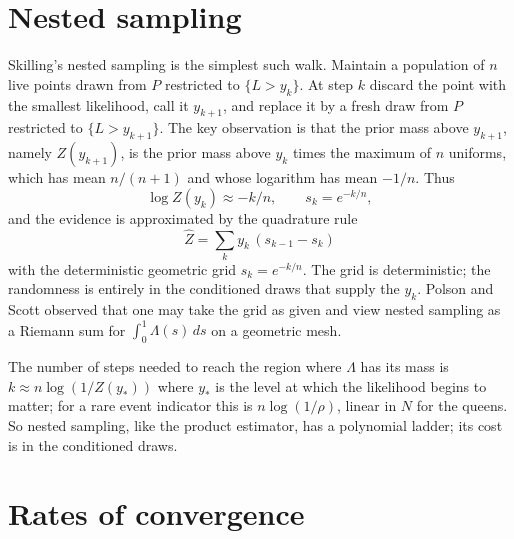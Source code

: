 \documentclass[11pt,twoside,openany]{book}
\theoremstyle{plain}
\theoremstyle{definition}
\theoremstyle{remark}
\begin{document}
\section{Nested sampling}

Skilling's nested sampling is the simplest such walk. Maintain a population of $n$ live points drawn from $P$ restricted to $\{L > y_k\}$. At step $k$ discard the point with the smallest likelihood, call it $y_{k+1}$, and replace it by a fresh draw from $P$ restricted to $\{L > y_{k+1}\}$. The key observation is that the prior mass above $y_{k+1}$, namely $Z(y_{k+1})$, is the prior mass above $y_k$ times the maximum of $n$ uniforms, which has mean $n / (n+1)$ and whose logarithm has mean $-1/n$. Thus
\[
\log Z(y_k) \approx -k / n , \qquad s_k = e^{-k/n} ,
\]
and the evidence is approximated by the quadrature rule
\[
\hat Z = \sum_k y_k \, ( s_{k-1} - s_k )
\]
with the deterministic geometric grid $s_k = e^{-k/n}$. The grid is deterministic; the randomness is entirely in the conditioned draws that supply the $y_k$. Polson and Scott observed that one may take the grid as given and view nested sampling as a Riemann sum for $\int_0^1 \Lambda(s) \, ds$ on a geometric mesh.

The number of steps needed to reach the region where $\Lambda$ has its mass is $k \approx n \log(1 / Z(y_*))$ where $y_*$ is the level at which the likelihood begins to matter; for a rare event indicator this is $n \log(1/\rho)$, linear in $N$ for the queens. So nested sampling, like the product estimator, has a polynomial ladder; its cost is in the conditioned draws.

\section{Rates of convergence}
\end{document}
